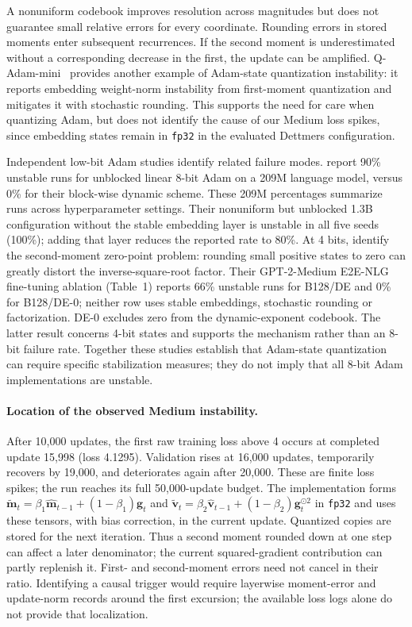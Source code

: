 \documentclass{article}
\begin{document}
A nonuniform codebook improves resolution across magnitudes but does not guarantee small relative errors for every coordinate. Rounding errors in stored moments enter subsequent recurrences. If the second moment is underestimated without a corresponding decrease in the first, the update can be amplified. Q-Adam-mini~\citep{han2025qadam} provides another example of Adam-state quantization instability: it reports embedding weight-norm instability from first-moment quantization and mitigates it with stochastic rounding. This supports the need for care when quantizing Adam, but does not identify the cause of our Medium loss spikes, since embedding states remain in \texttt{fp32} in the evaluated Dettmers configuration.


Independent low-bit Adam studies identify related failure modes. \citet[][Table~3]{dettmers2022bit} report 90\% unstable runs for unblocked linear 8-bit Adam on a 209M language model, versus 0\% for their block-wise dynamic scheme. These 209M percentages summarize runs across hyperparameter settings. Their nonuniform but unblocked 1.3B configuration without the stable embedding layer is unstable in all five seeds (100\%); adding that layer reduces the reported rate to 80\%. At 4 bits, \citet{li2024memory} identify the second-moment zero-point problem: rounding small positive states to zero can greatly distort the inverse-square-root factor. Their GPT-2-Medium E2E-NLG fine-tuning ablation (Table~1) reports 66\% unstable runs for B128/DE and 0\% for B128/DE-0; neither row uses stable embeddings, stochastic rounding or factorization. DE-0 excludes zero from the dynamic-exponent codebook. The latter result concerns 4-bit states and supports the mechanism rather than an 8-bit failure rate. Together these studies establish that Adam-state quantization can require specific stabilization measures; they do not imply that all 8-bit Adam implementations are unstable.


\paragraph{Location of the observed Medium instability.}
After 10,000 updates, the first raw training loss above 4 occurs at completed update 15,998 (loss 4.1295). Validation rises at 16,000 updates, temporarily recovers by 19,000, and deteriorates again after 20,000. These are finite loss spikes; the run reaches its full 50,000-update budget. The implementation forms
$\widetilde{\mathbf m}_t=\beta_1\widehat{\mathbf m}_{t-1}+(1-\beta_1)\mathbf g_t$
and
$\widetilde{\mathbf v}_t=\beta_2\widehat{\mathbf v}_{t-1}+(1-\beta_2)\mathbf g_t^{\odot2}$
in \texttt{fp32} and uses these tensors, with bias correction, in the current update. Quantized copies are stored for the next iteration. Thus a second moment rounded down at one step can affect a later denominator; the current squared-gradient contribution can partly replenish it. First- and second-moment errors need not cancel in their ratio. Identifying a causal trigger would require layerwise moment-error and update-norm records around the first excursion; the available loss logs alone do not provide that localization.
\end{document}
